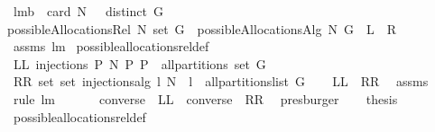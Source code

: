 \begin{isabellebody}
{\isafoldproof}%
%
\isadelimproof
\isanewline
%
\endisadelimproof
\isanewline
{}\isamarkupfalse%
\ lm{}{}b{\isacharcolon}\ \ {\isachardoublequoteopen}card\ N\ {\isachargreater}\ {}{\isachardoublequoteclose}\ {\isachardoublequoteopen}distinct\ G{\isachardoublequoteclose}\ \ \isanewline
{\isachardoublequoteopen}possibleAllocationsRel\ N\ {\isacharparenleft}set\ G{\isacharparenright}\ {\isacharequal}\ possibleAllocationsAlg{}\ N\ G{\isachardoublequoteclose}\ {\isacharparenleft}\ {\isachardoublequoteopen}{\isacharquery}L\ {\isacharequal}\ {\isacharquery}R{\isachardoublequoteclose}{\isacharparenright}%
\isadelimproof
\ %
\endisadelimproof
%
\isatagproof
{}\isamarkupfalse%
\ assms\ lm{}{}\ \isanewline
possible{\isacharunderscore}allocations{\isacharunderscore}rel{\isacharunderscore}def\ \isanewline
{}\isamarkupfalse%
\ {\isacharminus}\isanewline
\ \ \isamarkupfalse%
\ {\isacharquery}LL{\isacharequal}{\isachardoublequoteopen}{\isasymUnion}\ {\isacharbraceleft}injections\ P\ N{\isacharbar}\ P{\isachardot}\ P\ {\isasymin}\ all{\isacharunderscore}partitions\ {\isacharparenleft}set\ G{\isacharparenright}{\isacharbraceright}{\isachardoublequoteclose}\isanewline
\ \ \isamarkupfalse%
\ {\isacharquery}RR{\isacharequal}{\isachardoublequoteopen}{\isasymUnion}\ {\isacharparenleft}set\ {\isacharbrackleft}set\ {\isacharparenleft}injections{\isacharunderscore}alg\ l\ N{\isacharparenright}\ {\isachardot}\ l\ {\isasymleftarrow}\ all{\isacharunderscore}partitions{\isacharunderscore}list\ G{\isacharbrackright}{\isacharparenright}{\isachardoublequoteclose}\isanewline
\ \ \isamarkupfalse%
\ {\isachardoublequoteopen}{\isacharquery}LL\ {\isacharequal}\ {\isacharquery}RR{\isachardoublequoteclose}\ \isamarkupfalse%
\ assms\ \isamarkupfalse%
\ {\isacharparenleft}rule\ lm{}{}{\isacharparenright}\ \isamarkupfalse%
\isanewline
\ \ \isamarkupfalse%
\ \isamarkupfalse%
\ {\isachardoublequoteopen}converse\ {\isacharbackquote}\ {\isacharquery}LL\ {\isacharequal}\ converse\ {\isacharbackquote}\ {\isacharquery}RR{\isachardoublequoteclose}\ \isamarkupfalse%
\ presburger\isanewline
\ \ \isamarkupfalse%
\ {\isacharquery}thesis\ \isamarkupfalse%
\ possible{\isacharunderscore}allocations{\isacharunderscore}rel{\isacharunderscore}def\ \isamarkupfalse%

\end{isabellebody}
